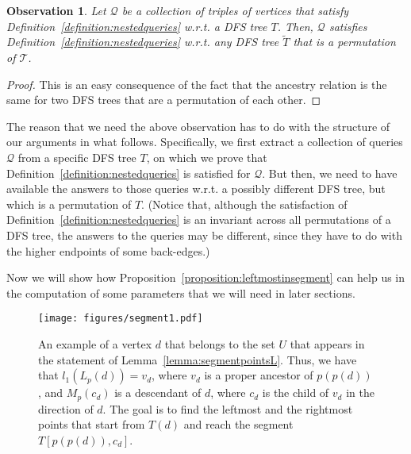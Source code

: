 \documentclass[11pt,a4paper]{article}
\newtheorem{observation}[theorem]{Observation}
\begin{document}
\begin{observation}
\label{observation:nestedqueries}
Let $\mathcal{Q}$ be a collection of triples of vertices that satisfy Definition~\ref{definition:nestedqueries} w.r.t. a DFS tree $T$. Then, $\mathcal{Q}$ satisfies Definition~\ref{definition:nestedqueries} w.r.t. any DFS tree $\widetilde{T}$ that is a permutation of $\mathcal{T}$.
\end{observation}
\begin{proof}
This is an easy consequence of the fact that the ancestry relation is the same for two DFS trees that are a permutation of each other.
\end{proof}

The reason that we need the above observation has to do with the structure of our arguments in what follows. Specifically, we first extract a collection of queries $\mathcal{Q}$ from a specific DFS tree $T$, on which we prove that Definition~\ref{definition:nestedqueries} is satisfied for $\mathcal{Q}$. But then, we need to have available the answers to those queries w.r.t. a possibly different DFS tree, but which is a permutation of $T$. (Notice that, although the satisfaction of Definition~\ref{definition:nestedqueries} is an invariant across all permutations of a DFS tree, the answers to the queries may be different, since they have to do with the higher endpoints of some back-edges.)

Now we will show how Proposition~\ref{proposition:leftmostinsegment} can help us in the computation of some parameters that we will need in later sections.

\begin{figure}[h!]\centering
\texttt{[image: figures/segment1.pdf]}
\caption{\small{An example of a vertex $d$ that belongs to the set $U$ that appears in the statement of Lemma~\ref{lemma:segmentpointsL}. Thus, we have that $l_1(L_p(d))=v_d$, where $v_d$ is a proper ancestor of $p(p(d))$, and $M_p(c_d)$ is a descendant of $d$, where $c_d$ is the child of $v_d$ in the direction of $d$. The goal is to find the leftmost and the rightmost points that start from $T(d)$ and reach the segment $T[p(p(d)),c_d]$.}}\label{figure:segment1}
\end{figure}
\end{document}
